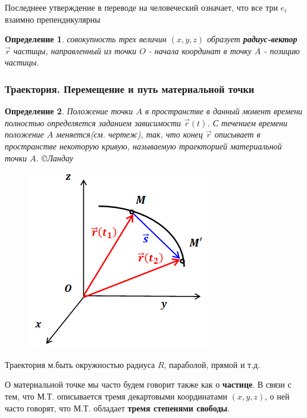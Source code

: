 \documentclass{article}
\newtheorem{theorem}{Определение} %
\begin{document}
Последнеее утверждение в переводе на человеческий означает, что все три $e_i$ взаимно препендикулярны
\begin{theorem}
совокупность трех величин $(x,y,z)$ образует \textbf{радиус-вектор} $\vec{r}$ частицы, направленный из точки $O$ - начала координат в точку $A$ - позицию частицы. 
\end{theorem}

\subsubsection{Траектория. Перемещение и путь материальной точки}
\begin{theorem}
Положение точки $A$  в пространстве в данный момент времени полностью определяется заданием зависимости $\vec{r}(t)$. С течением времени положение $A$ меняется(см. чертеж), так, что конец $\vec{r}$ описывает в пространстве некоторую кривую, называемую траекторией материальной точки $A$.
\copyright{Ландау}
\end{theorem}

\begin{figure}[H]
\centering
\includegraphics[scale=1.00]{trajectory.png}
\caption{}
\label{}
\end{figure}
Траектория м.быть окружностью радиуса $R$, параболой, прямой и т.д.
 
О материальной точке мы часто будем говорит также как о \textbf{частице}. В связи с тем, что М.Т. описывается тремя декартовыми координатами $(x,y,z)$, о ней часто говорят, что М.Т. обладает \textbf{тремя степенями свободы}.
\end{document}
